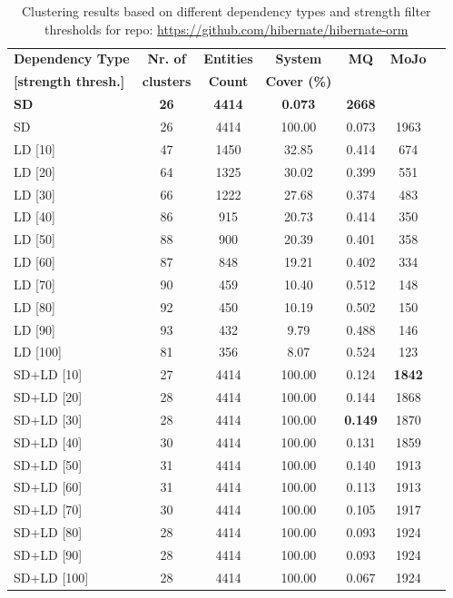 \documentclass{ieeeaccess}
\begin{document}
\begin{table}
\caption{Clustering results based on different dependency types and strength filter thresholds for repo: \href{https://github.com/hibernate/hibernate-orm}{https://github.com/hibernate/hibernate-orm}}
\label{tab:clustering_results_hibernate}
\centering
\setlength{\tabcolsep}{3pt}
\begin{tabular}{|l|c|c|c|c|c|c|}
\hline
\textbf{Dependency Type} & \textbf{Nr. of} & \textbf{Entities} & \textbf{System} & \textbf{MQ} & \textbf{MoJo} \\
\textbf{[strength thresh.]} & \textbf{clusters} & \textbf{Count} & \textbf{Cover (\%)} &  &  \\
\hline
\textbf{SD} & \textbf{26} & \textbf{4414} & \textbf{0.073} & \textbf{2668} \\
\hline
SD & 26 & 4414 & 100.00 & 0.073 & 1963 \\
\hline
LD [10] & 47 & 1450 & 32.85 & 0.414 & 674 \\
LD [20] & 64 & 1325 & 30.02 & 0.399 & 551 \\
LD [30] & 66 & 1222 & 27.68 & 0.374 & 483 \\
LD [40] & 86 & 915 & 20.73 & 0.414 & 350 \\
LD [50] & 88 & 900 & 20.39 & 0.401 & 358 \\
LD [60] & 87 & 848 & 19.21 & 0.402 & 334 \\
LD [70] & 90 & 459 & 10.40 & 0.512 & 148 \\
LD [80] & 92 & 450 & 10.19 & 0.502 & 150 \\
LD [90] & 93 & 432 & 9.79 & 0.488 & 146 \\
LD [100] & 81 & 356 & 8.07 & 0.524 & 123 \\
\hline
SD+LD [10] & 27 & 4414 & 100.00 & 0.124 &  \cellcolor[HTML]{C0C0C0}\textbf{1842} \\
SD+LD [20] & 28 & 4414 & 100.00 & 0.144 & 1868 \\
SD+LD [30] & 28 & 4414 & 100.00 &  \cellcolor[HTML]{C0C0C0}\textbf{0.149}& 1870 \\
SD+LD [40] & 30 & 4414 & 100.00 & 0.131 & 1859 \\
SD+LD [50] & 31 & 4414 & 100.00 & 0.140 & 1913 \\
SD+LD [60] & 31 & 4414 & 100.00 & 0.113 & 1913 \\
SD+LD [70] & 30 & 4414 & 100.00 & 0.105 & 1917 \\
SD+LD [80] & 28 & 4414 & 100.00 & 0.093 & 1924 \\
SD+LD [90] & 28 & 4414 & 100.00 & 0.093 & 1924 \\
SD+LD [100] & 28 & 4414 & 100.00 & 0.067 & 1924 \\
\hline
\end{tabular}
\end{table}
\end{document}
